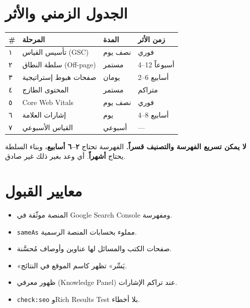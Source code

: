 \documentclass[11pt]{article}
\begin{document}
\section{الجدول الزمني والأثر}

\renewcommand{\arraystretch}{1.35}
\begin{longtable}{@{}p{} p{} p{} p{}@{}}
\toprule
\textbf{\#} & \textbf{المرحلة} & \textbf{المدة} & \textbf{زمن الأثر} \\
\midrule
\endhead
١ & تأسيس القياس (GSC) & نصف يوم & فوري \\
٢ & سلطة النطاق (Off-page) & مستمر & 4--12 أسبوعاً \\
٣ & صفحات هبوط إستراتيجية & يومان & 2--6 أسابيع \\
٤ & المحتوى الطازج & مستمر & متراكم \\
٥ & Core Web Vitals & نصف يوم & فوري \\
٦ & إشارات العلامة & يوم & 4--8 أسابيع \\
٧ & القياس الأسبوعي & أسبوعي & — \\
\bottomrule
\end{longtable}
\renewcommand{\arraystretch}{1.0}

\begin{warnbox}
\textbf{لا يمكن تسريع الفهرسة والتصنيف قسراً.} الفهرسة تحتاج \textbf{٢--٦ أسابيع}،
وبناء السلطة يحتاج \textbf{أشهراً}. أي وعد بغير ذلك غير صادق.
\end{warnbox}

\section{معايير القبول}

\begin{itemize}
  \item[${\color{okgreen}\faCheckCircle}$] المنصة موثّقة في Google Search Console ومفهرسة.
  \item[${\color{okgreen}\faCheckCircle}$] \texttt{sameAs} مملوء بحسابات المنصة الرسمية.
  \item[${\color{okgreen}\faCheckCircle}$] صفحات الكتب والمسائل لها عناوين وأوصاف مُحسَّنة.
  \item[${\color{okgreen}\faCheckCircle}$] «يَسِّر» تظهر كاسم الموقع في النتائج.
  \item[${\color{okgreen}\faCheckCircle}$] ظهور معرفي (Knowledge Panel) عند تراكم الإشارات.
  \item[${\color{okgreen}\faCheckCircle}$] \texttt{check:seo} وRich Results Test بلا أخطاء.
\end{itemize}
\end{document}
